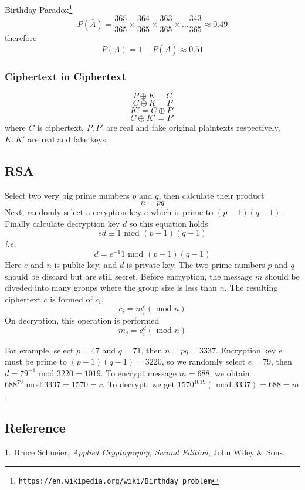 Birthday Paradox\footnote{\tt{https://en.wikipedia.org/wiki/Birthday\_problem}}
$$ P(\overline A) = \frac{365}{365} \times \frac{364}{365} \times \frac{363}{365} \times \ldots \frac{343}{365} \approx 0.49 $$
therefore
$$ P(A) = 1 - P(\overline A) \approx 0.51 $$

\subsubsection{Ciphertext in Ciphertext}

$$ P\oplus K = C$$
$$ C\oplus K = P$$
$$ K' = C \oplus P' $$
$$ C\oplus K' = P' $$
where $C$ is ciphertext, $P, P'$ are real and fake original plaintexts respectively, $K, K'$ are real and fake keys.

\subsection{RSA}

Select two very big prime numbers $p$ and $q$, then calculate their product
$$ n = pq$$
Next, randomly select a ecryption key $e$ which is prime to $(p-1)(q-1)$. Finally
calculate decryption key $d$ so this equation holds
$$ed \equiv 1 \text{ mod }(p-1)(q-1)$$
{\it i.e.}
$$d = e^{-1} 1 \text{ mod }(p-1)(q-1)$$
Here $e$ and $n$ is public key, and $d$ is private key. The two prime numbers $p$ and $q$ should
be discard but are still secret. Before encryption, the message $m$ should be diveded into
many groups where the group size is less than $n$. The resulting ciphertext $c$ is formed
of $c_i$,
$$ c_i = m_i^e (\text{ mod }n) $$
On decryption, this operation is performed
$$ m_j = c_i^d (\text{ mod }n)  $$

For example, select $p=47$ and $q=71$, then $n=pq=3337$. Encryption key $e$ must be prime to
$(p-1)(q-1)=3220$, so we randomly select $e=79$, then $d=79^{-1} \text{ mod }3220 = 1019 $. To encrypt
message $m=688$, we obtain $688^{79} \text{ mod }3337 = 1570 = c$. To decrypt, we get
$1570^{1019} (\text{ mod } 3337) = 688 = m$.

\subsection{Reference}

1. Bruce Schneier, {\it Applied Cryptography, Second Edition}, John Wiley \& Sons.
